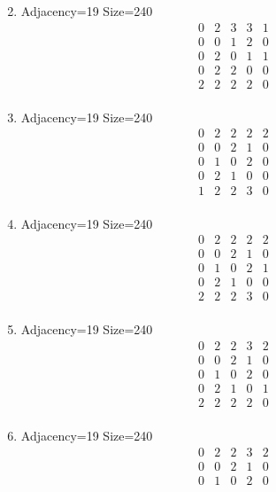\documentclass[12pt]{article}
\begin{document}
\begin{multicols}{3}
\begin{enumerate}
\begin{equation*}
\end{equation*}
\item Adjacency=19 Size=240
\begin{equation*}
\begin{array}{ccccc}
0&2&3&3&1\\
0&0&1&2&0\\
0&2&0&1&1\\
0&2&2&0&0\\
2&2&2&2&0\\
\end{array}
\end{equation*}
\item Adjacency=19 Size=240
\begin{equation*}
\begin{array}{ccccc}
0&2&2&2&2\\
0&0&2&1&0\\
0&1&0&2&0\\
0&2&1&0&0\\
1&2&2&3&0\\
\end{array}
\end{equation*}
\item Adjacency=19 Size=240
\begin{equation*}
\begin{array}{ccccc}
0&2&2&2&2\\
0&0&2&1&0\\
0&1&0&2&1\\
0&2&1&0&0\\
2&2&2&3&0\\
\end{array}
\end{equation*}
\item Adjacency=19 Size=240
\begin{equation*}
\begin{array}{ccccc}
0&2&2&3&2\\
0&0&2&1&0\\
0&1&0&2&0\\
0&2&1&0&1\\
2&2&2&2&0\\
\end{array}
\end{equation*}
\item Adjacency=19 Size=240
\begin{equation*}
\begin{array}{ccccc}
0&2&2&3&2\\
0&0&2&1&0\\
0&1&0&2&0\\

\end{array}
\end{equation*}
\end{enumerate}
\end{multicols}
\end{document}
